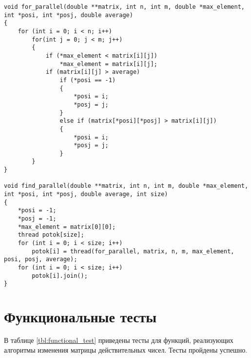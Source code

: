\begin{lstlisting}[label=lst:lst2,caption=Параллельный алгоритм]
void for_parallel(double **matrix, int n, int m, double *max_element, int *posi, int *posj, double average)
{
    for (int i = 0; i < n; i++)
        for(int j = 0; j < m; j++)
        {
            if (*max_element < matrix[i][j])
                *max_element = matrix[i][j];
            if (matrix[i][j] > average)
                if (*posi == -1)
                {
                    *posi = i;
                    *posj = j;
                }
                else if (matrix[*posi][*posj] > matrix[i][j])
                {
                    *posi = i;
                    *posj = j;
                }
        }
}

void find_parallel(double **matrix, int n, int m, double *max_element, int *posi, int *posj, double average, int size)
{
    *posi = -1;
    *posj = -1;
    *max_element = matrix[0][0];
    thread potok[size];  
    for (int i = 0; i < size; i++)
        potok[i] = thread(for_parallel, matrix, n, m, max_element, posi, posj, average);
    for (int i = 0; i < size; i++)
        potok[i].join();
}
\end{lstlisting}

\section{Функциональные тесты}

В таблице \ref{tbl:functional_test} приведены тесты для функций, реализующих алгоритмы изменения матрицы действительных чисел. Тесты пройдены успешно.

